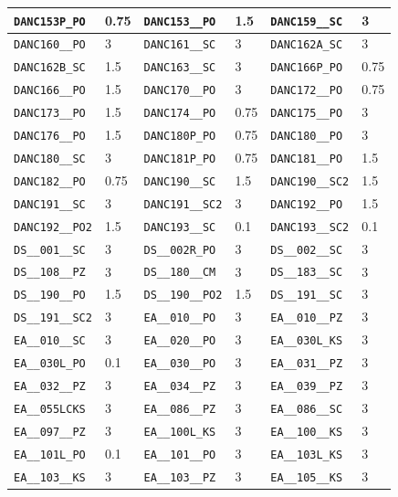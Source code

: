 \begin{longtable}{|l|l||l|l||l|l|}
    \verb|DANC153P_PO| & 0.75 & \verb|DANC153__PO| & 1.5 & \verb|DANC159__SC| & 3\\\hline
    \verb|DANC160__PO| & 3 & \verb|DANC161__SC| & 3 & \verb|DANC162A_SC| & 3\\\hline
    \verb|DANC162B_SC| & 1.5 & \verb|DANC163__SC| & 3 & \verb|DANC166P_PO| & 0.75\\\hline
    \verb|DANC166__PO| & 1.5 & \verb|DANC170__PO| & 3 & \verb|DANC172__PO| & 0.75\\\hline
    \verb|DANC173__PO| & 1.5 & \verb|DANC174__PO| & 0.75 & \verb|DANC175__PO| & 3\\\hline
    \verb|DANC176__PO| & 1.5 & \verb|DANC180P_PO| & 0.75 & \verb|DANC180__PO| & 3\\\hline
    \verb|DANC180__SC| & 3 & \verb|DANC181P_PO| & 0.75 & \verb|DANC181__PO| & 1.5\\\hline
    \verb|DANC182__PO| & 0.75 & \verb|DANC190__SC| & 1.5 & \verb|DANC190__SC2| & 1.5\\\hline
    \verb|DANC191__SC| & 3 & \verb|DANC191__SC2| & 3 & \verb|DANC192__PO| & 1.5\\\hline
    \verb|DANC192__PO2| & 1.5 & \verb|DANC193__SC| & 0.1 & \verb|DANC193__SC2| & 0.1\\\hline
    \verb|DS__001__SC| & 3 & \verb|DS__002R_PO| & 3 & \verb|DS__002__SC| & 3\\\hline
    \verb|DS__108__PZ| & 3 & \verb|DS__180__CM| & 3 & \verb|DS__183__SC| & 3\\\hline
    \verb|DS__190__PO| & 1.5 & \verb|DS__190__PO2| & 1.5 & \verb|DS__191__SC| & 3\\\hline
    \verb|DS__191__SC2| & 3 & \verb|EA__010__PO| & 3 & \verb|EA__010__PZ| & 3\\\hline
    \verb|EA__010__SC| & 3 & \verb|EA__020__PO| & 3 & \verb|EA__030L_KS| & 3\\\hline
    \verb|EA__030L_PO| & 0.1 & \verb|EA__030__PO| & 3 & \verb|EA__031__PZ| & 3\\\hline
    \verb|EA__032__PZ| & 3 & \verb|EA__034__PZ| & 3 & \verb|EA__039__PZ| & 3\\\hline
    \verb|EA__055LCKS| & 3 & \verb|EA__086__PZ| & 3 & \verb|EA__086__SC| & 3\\\hline
    \verb|EA__097__PZ| & 3 & \verb|EA__100L_KS| & 3 & \verb|EA__100__KS| & 3\\\hline
    \verb|EA__101L_PO| & 0.1 & \verb|EA__101__PO| & 3 & \verb|EA__103L_KS| & 3\\\hline
    \verb|EA__103__KS| & 3 & \verb|EA__103__PZ| & 3 & \verb|EA__105__KS| & 3\\\hline

\end{longtable}
